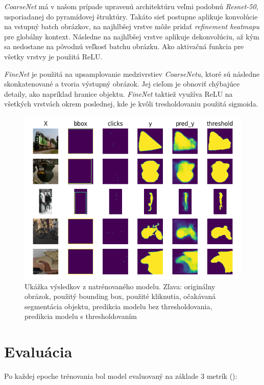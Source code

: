 \documentclass [11pt, a4paper, twocolumn]{article}
\begin{document}
\textit{CoarseNet} má v našom prípade upravenú architektúru veľmi podobnú \textit{Resnet-50}, usporiadanej do pyramídovej štruktúry. Takáto sieť postupne aplikuje konvolúcie na vstupný batch obrázkov, na najhlbšej vrstve môže pridať \textit{refinement heatmapu} pre globálny kontext. Následne na najhlbšej vrstve aplikuje dekonvolúciu, až kým sa nedostane na pôvodnú veľkosť batchu obrázku. Ako aktivačná funkcia pre všetky vrstvy je použitá ReLU.

\textit{FineNet} je použitá na upsamplovanie medzivrstiev \textit{CoarseNetu}, ktoré sú následne skonkatenované a tvoria výstupný obrázok. Jej cieľom je obnoviť chýbajúce detaily, ako napríklad hranice objektu. \textit{FineNet} taktiež využíva ReLU na všetkých vrstvách okrem poslednej, kde je kvôli tresholdovaniu použitá sigmoida.

\begin{figure}[H]
\centering
\includegraphics[width=\linewidth]{results}
\caption{Ukážka výsledkov z natrénovaného modelu. Zľava: originálny obrázok, použitý bounding box, použité kliknutia, očakávaná segmentácia objektu, predikcia modelu bez thresholdovania, predikcia modelu s thresholdovaním}
\end{figure}

\section{Evaluácia}
Po každej epoche trénovania bol model evaluovaný na základe 3 metrík (\cite{tiu_2020}):
\end{document}
